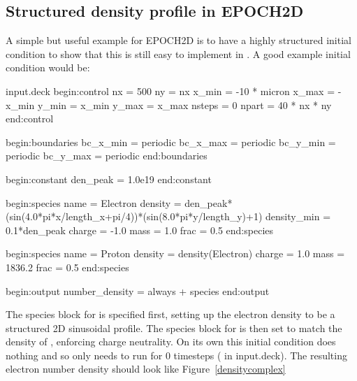 \subsection{Structured density profile in EPOCH2D}

A simple but useful example for EPOCH2D is to have a highly structured initial
condition to show that this is still easy to implement in {\EPOCH}. A good
example initial condition would be:
\begin{lboxverbatim2}{input.deck}
begin:control
   nx = 500
   ny = nx
   x_min = -10 * micron
   x_max = -x_min
   y_min = x_min
   y_max = x_max
   nsteps = 0
   npart = 40 * nx * ny
end:control

begin:boundaries
   bc_x_min = periodic
   bc_x_max = periodic
   bc_y_min = periodic
   bc_y_max = periodic
end:boundaries

begin:constant
   den_peak = 1.0e19
end:constant

begin:species
   name = Electron
   density = den_peak*(sin(4.0*pi*x/length_x+pi/4))*(sin(8.0*pi*y/length_y)+1)
   density_min = 0.1*den_peak
   charge = -1.0
   mass = 1.0
   frac = 0.5
end:species

begin:species
   name = Proton
   density = density(Electron)
   charge = 1.0
   mass = 1836.2
   frac = 0.5
end:species

begin:output
   number_density = always + species
end:output
\end{lboxverbatim2}


The species block for  is specified
first, setting up the electron density to be a structured 2D sinusoidal
profile. The species block for  is then set to
match the density of , enforcing charge neutrality. On
its own this initial condition does nothing and so only needs to run for 0
timesteps ( in input.deck). The resulting electron number
density should look like Figure~\ref{densitycomplex}
\pagebreak

